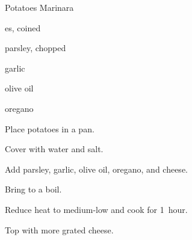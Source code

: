 \begin{recipe}{Potatoes Marinara}{}{}

\begin{ingredients}
\item {}es, coined
\item parsley, chopped
\item garlic
\item {} olive oil
\item oregano
\item {}
\end{ingredients}

\begin{directions}
\item Place potatoes in a pan.
\item Cover with water and salt.
\item Add parsley, garlic, olive oil, oregano, and cheese.
\item Bring to a boil.
\item Reduce heat to medium-low and cook for 1~hour.
\item Top with more grated cheese.
\end{directions}

\end{recipe}
